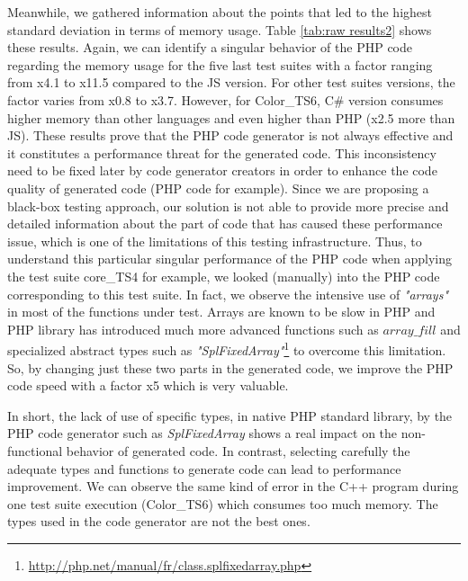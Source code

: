 Meanwhile, we gathered information about the points that led to the highest standard deviation in terms of memory usage. Table \ref{tab:raw results2} shows these results. %
Again, we can identify a singular behavior of the PHP code regarding the memory usage for the five last test suites with a factor ranging from x4.1 to x11.5 compared to the JS version.  For other test suites versions, the factor varies from x0.8 to x3.7. However, for Color\_TS6, C\# version consumes higher memory than other languages and even higher than PHP (x2.5 more than JS). %
These results prove that the PHP code generator is not always effective and it constitutes a performance threat for the generated code.
This inconsistency need to be fixed later by code generator creators in order to enhance the code quality of generated code (PHP code for example). Since we are proposing a black-box testing approach, our solution is not able to provide more precise and detailed information about the part of code that has caused these performance issue, which is one of the limitations of this testing infrastructure.
Thus, to understand this particular singular performance of the PHP code when applying the test suite core\_TS4 for example, we looked (manually) into the PHP code corresponding to this test suite. In fact, we observe the intensive use of \textit{"arrays"} in most of the functions under test. Arrays are known to be slow in PHP and PHP library has introduced much more advanced functions such as $array\_fill$ and specialized abstract types such as \textit{"SplFixedArray"}\footnote{\url{http://php.net/manual/fr/class.splfixedarray.php}} to overcome this limitation. So, by changing just these two parts in the generated code, we improve the PHP code speed with a factor x5 which is very valuable. 


In short, the lack of use of specific types, in native PHP standard library, by the PHP code generator such as \textit{SplFixedArray} shows a real impact on the non-functional behavior of generated code. In contrast, selecting carefully the adequate types and functions to generate code can lead to performance improvement. We can observe the same kind of error in the C++ program  during one test suite execution (Color\_TS6) which consumes too much memory. The types used in the code generator are not the best ones. 

